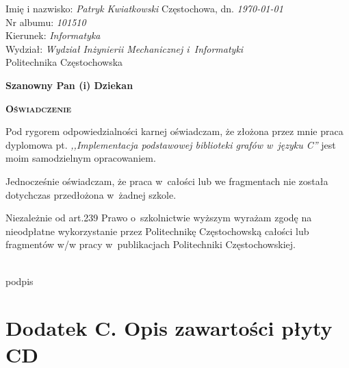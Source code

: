 \documentclass[a4paper,12pt,polish,oneside,openright]{thesis}
\begin{document}
Imię i nazwisko: \emph{Patryk Kwiatkowski} \hfill Częstochowa, dn. \emph{\today} \\
Nr albumu: \emph{101510} \\
Kierunek: \emph{Informatyka} \\
Wydział: \emph{Wydział Inżynierii Mechanicznej i~Informatyki} \\

\vfill
Politechnika Częstochowska
\vfill
\begin{flushright}
\textbf{Szanowny Pan (i) Dziekan} \hspace*{1cm}
\end{flushright}
\vfill
\begin{center}
\textbf{\textsc{\large Oświadczenie}}
\end{center}
\vfill

Pod rygorem odpowiedzialności karnej oświadczam, że złożona przez mnie praca dyplomowa pt. \emph{,,Implementacja podstawowej biblioteki grafów w~języku C''} jest moim samodzielnym opracowaniem.

Jednocześnie oświadczam, że praca w~całości lub we fragmentach nie została dotychczas przedłożona w~żadnej szkole.

Niezależnie od art.239 Prawo o~szkolnictwie wyższym wyrażam zgodę na nieodpłatne wykorzystanie przez Politechnikę Częstochowską całości lub fragmentów w/w pracy w~publikacjach Politechniki Częstochowskiej.

\vfill

\begin{center}
	\begin{minipage}{0.7\textwidth}
		\begin{flushright}
		\begin{minipage}{0.4\textwidth}
			\begin{center}
			\dotfill\\
			podpis
			\end{center}
		\end{minipage}
		\end{flushright}
	\end{minipage}
\end{center}

\setlength{\parskip}{\oldparskip}


\chapter*{Dodatek C. Opis zawartości płyty CD}
\label{chap:cd}

\listoffigures
\listoftables
\lstlistoflistings
\end{document}
